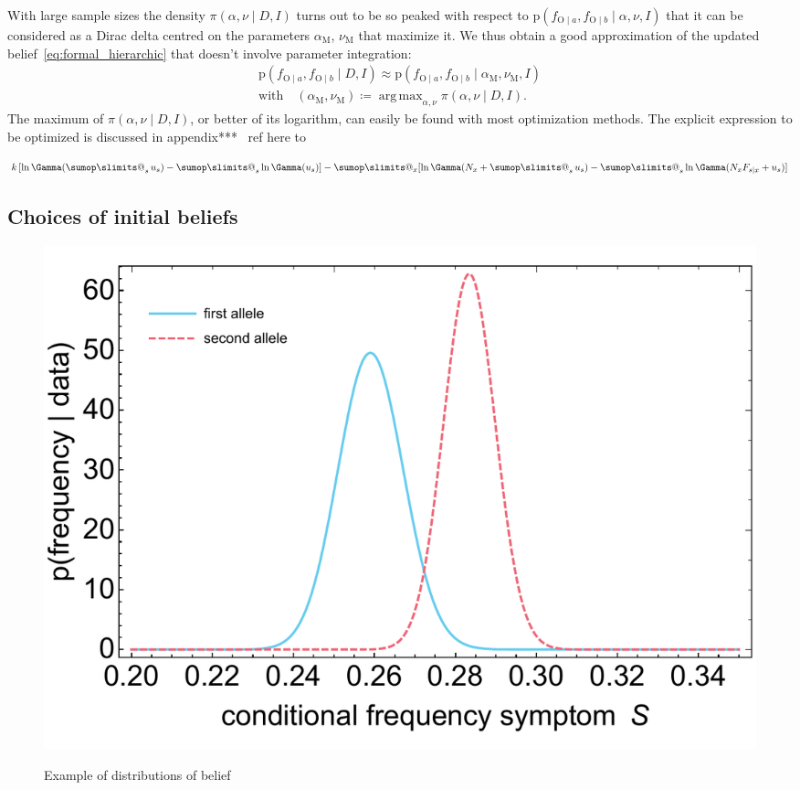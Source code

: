 \documentclass[\ifafour a4paper,12pt,\else a5paper,10pt,\fi%
onecolumn,oneside,article,%
british%
]{memoir}
\makeatletter
\theoremstyle{remark}
\theoremstyle{innote}
\def\sum{\DOTSI\sumop\slimits@}
\newcommand*{\citep}{\parencites}
\newcommand*{\defd}{\coloneqq}
\newcommand*{\pf}{\mathrm{p}}%
\renewcommand*{\|}{\mathpunct{|}}
\newcommand*{\tsum}{\mathop{\textstyle\sum}\nolimits}
\newcommand*{\puzzle}{\maltese}
\newcommand{\mynote}[1]{ {\color{notecolour}\puzzle\ #1}}
\DeclareMathOperator*{\argmax}{arg\,max}
\newcommand*{\yD}{D}
\newcommand*{\yI}{I}
\newcommand*{\ya}{a}
\newcommand*{\yb}{b}
\newcommand*{\ysA}{\textrm{O}}%
\newcommand*{\dA}{\pi}
\newcommand*{\yA}{\alpha}
\newcommand*{\yq}{\nu}
\newcommand*{\yAm}{\alpha_{\text{M}}}
\newcommand*{\yqm}{\nu_{\text{M}}}
\newcommand*{\yu}{u}
\newcommand*{\yna}{k}
\makeatother
\begin{document}
With large sample sizes the density $\dA(\yA,\yq \|\yD, \yI)$ turns out to
be so peaked with respect to
$\pf(f_{\ysA\|\ya}, f_{\ysA\|\yb}\| \yA,\yq,\yI)$ that it can be considered
as a Dirac delta centred on the parameters $\yAm$, $\yqm$ that maximize it.
We thus obtain a good approximation of the updated
belief~\eqref{eq:formal_hierarchic} that doesn't involve parameter integration:
\begin{multline}
  \label{eq:formal_hierarchic_approx}
  \pf(f_{\ysA\|\ya}, f_{\ysA\|\yb} \| \yD, \yI) \approx
  \pf(f_{\ysA\|\ya}, f_{\ysA\|\yb}\| \yAm,\yqm,\yI)\\
  \text{with}\quad
  (\yAm,\yqm) \defd \argmax_{\yA,\yq}\dA(\yA,\yq \|\yD, \yI).
\end{multline}
The maximum of $\dA(\yA,\yq \|\yD, \yI)$, or better of its logarithm, can
easily be found with most optimization methods. The explicit expression to
be optimized is discussed in appendix*** \mynote{ref here to \citep{mackay1996}}

\begin{equation}
  \label{eq:to_optimize}
  \yna\,[\ln\Gamma(\tsum_s\yu_s) - \tsum_s\ln\Gamma(\yu_s)]
  -\sum_x
  [\ln\Gamma(N_x+\tsum_s\yu_s) - \tsum_s\ln\Gamma(N_xF_{s\|x}+\yu_s)]
\end{equation}




\subsection{Choices of initial beliefs}
\label{sec:choices_prior_info}






\begin{figure}[b!]%
 \centering\includegraphics[width=0.75\linewidth]{example_distr_condfreqs.pdf}\\
\caption{Example of distributions of belief}\label{fig:example_distributions}
\end{figure}%
\end{document}

